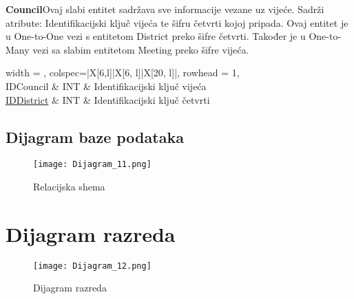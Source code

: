 							
							
							\textbf{\large Council}\quad\quad Ovaj slabi entitet sadržava sve informacije vezane uz vijeće. Sadrži atribute: Identifikacijski ključ vijeća te šifru četvrti kojoj pripada. Ovaj entitet je u One-to-One vezi s entitetom District preko šifre četvrti. Također je u One-to-Many vezi sa slabim entitetom Meeting preko šifre vijeća.
							
							\begin{longtblr}[
					label=none,
					entry=none
					]{
						width = \textwidth,
						colspec={|X[6,l]|X[6, l]|X[20, l]|}, 
						rowhead = 1,
					} %
					\hline {}	 \\ \hline[3pt]
					IDCouncil & INT	&  	Identifikacijski ključ vijeća  	\\ \hline
					\underline{IDDistrict}	 & INT & Identifikacijski ključ četvrti  	\\ \hline
							\end{longtblr}
							
							
			\eject	
			
			\subsection{Dijagram baze podataka}
	\begin{figure}[h]
	\centering
  \hbox{\hspace{-2.2cm}\texttt{[image: Dijagram\_11.png]}}
  \caption{Relacijska shema}
  \label{Relacijska_shema}
\end{figure}
			
			\eject
			
		\section{Dijagram razreda}
		
		\begin{figure}[H]
		\centering
		\texttt{[image: Dijagram\_12.png]}
		\caption{Dijagram razreda}
		\end{figure}
			
			
			
			\eject
			
